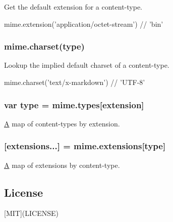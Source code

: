 Get the default extension for a content-\/type.


\begin{DoxyCode}
mime.extension(\textcolor{stringliteral}{'application/octet-stream'}) \textcolor{comment}{// 'bin'}
\end{DoxyCode}


\subsubsection*{mime.\+charset(type)}

Lookup the implied default charset of a content-\/type.


\begin{DoxyCode}
mime.charset(\textcolor{stringliteral}{'text/x-markdown'}) \textcolor{comment}{// 'UTF-8'}
\end{DoxyCode}


\subsubsection*{var type = mime.\+types\mbox{[}extension\mbox{]}}

\hyperlink{class_a}{A} map of content-\/types by extension.

\subsubsection*{\mbox{[}extensions...\mbox{]} = mime.\+extensions\mbox{[}type\mbox{]}}

\hyperlink{class_a}{A} map of extensions by content-\/type.

\subsection*{License}

\mbox{[}M\+I\+T\mbox{]}(L\+I\+C\+E\+N\+S\+E) 